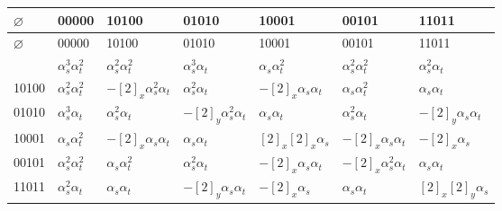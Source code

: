 \begin{longtable}{|l||p{2.1cm}|p{2.1cm}|p{2.1cm}|p{2.1cm}|p{2.1cm}|p{2.1cm}|}
\hline
$\varnothing$ & 00000 & 10100 & 01010 & 10001 & 00101 & 11011 \\ \hline
\endfirsthead
$\varnothing$ & 00000 & 10100 & 01010 & 10001 & 00101 & 11011 \\ \hline
\endhead
\endfoot
\hline
\endlastfoot
00000
& $\alpha_s^3\alpha_t^2$ %
& $\alpha_s^2\alpha_t^2$ %
& $\alpha_s^3\alpha_t$ %
& $\alpha_s\alpha_t^2$ %
& $\alpha_s^2\alpha_t^2$ %
& $\alpha_s^2\alpha_t$ %
\\
10100
& $\alpha_s^2\alpha_t^2$ %
& $-[2]_x\alpha_s^2\alpha_t$ %
& $\alpha_s^2\alpha_t$ %
& $-[2]_x\alpha_s\alpha_t$ %
& $\alpha_s\alpha_t^2$ %
& $\alpha_s\alpha_t$ %
\\
01010
& $\alpha_s^3\alpha_t$ %
& $\alpha_s^2\alpha_t$ %
& $-[2]_y\alpha_s^2\alpha_t$ %
& $\alpha_s\alpha_t$ %
& $\alpha_s^2\alpha_t$ %
& $-[2]_y\alpha_s\alpha_t$ %
\\
10001
& $\alpha_s\alpha_t^2$ %
& $-[2]_x\alpha_s\alpha_t$ %
& $\alpha_s\alpha_t$ %
& $[2]_x[2]_x\alpha_s$ %
& $-[2]_x\alpha_s\alpha_t$ %
& $-[2]_x\alpha_s$ %
\\
00101
& $\alpha_s^2\alpha_t^2$ %
& $\alpha_s\alpha_t^2$ %
& $\alpha_s^2\alpha_t$ %
& $-[2]_x\alpha_s\alpha_t$ %
& $-[2]_x\alpha_s^2\alpha_t$ %
& $\alpha_s\alpha_t$ %
\\
11011
& $\alpha_s^2\alpha_t$ %
& $\alpha_s\alpha_t$ %
& $-[2]_y\alpha_s\alpha_t$ %
& $-[2]_x\alpha_s$ %
& $\alpha_s\alpha_t$ %
& $[2]_x[2]_y\alpha_s$ %
\\
\end{longtable}
\vspace{-0.4em}

